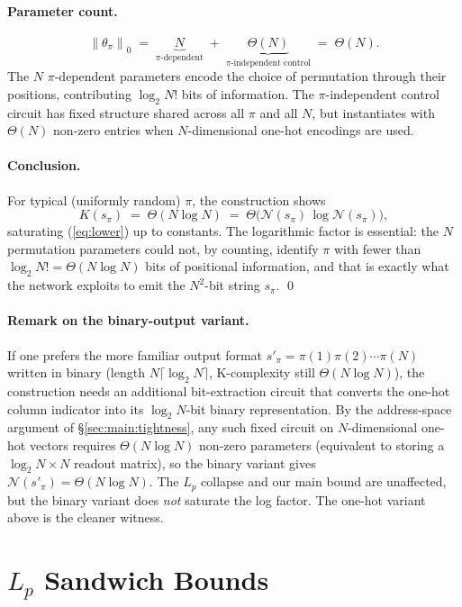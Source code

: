 \documentclass{article}
\theoremstyle{definition}
\newcommand{\norm}[1]{\left\lVert#1\right\rVert}
\newcommand{\nc}{\mathcal{N}}
\begin{document}
\paragraph{Parameter count.}
\[
  \norm{\theta_\pi}_0 \;=\; \underbrace{N}_{\pi\text{-dependent}} \;+\; \underbrace{\Theta(N)}_{\pi\text{-independent control}} \;=\; \Theta(N).
\]
The $N$ $\pi$-dependent parameters encode the choice of permutation through
their positions, contributing $\log_2 N!$ bits of information. The
$\pi$-independent control circuit has fixed structure shared across all $\pi$
and all $N$, but instantiates with $\Theta(N)$ non-zero entries when
$N$-dimensional one-hot encodings are used.

\paragraph{Conclusion.} For typical (uniformly random) $\pi$, the construction shows
\[
  K(s_\pi) \;=\; \Theta(N \log N) \;=\; \Theta\!\bigl(\nc(s_\pi)\, \log \nc(s_\pi)\bigr),
\]
saturating (\ref{eq:lower}) up to constants. The logarithmic factor is
essential: the $N$ permutation parameters could not, by counting, identify
$\pi$ with fewer than $\log_2 N! = \Theta(N \log N)$ bits of positional
information, and that is exactly what the network exploits to emit the
$N^2$-bit string $s_\pi$. \qed

\paragraph{Remark on the binary-output variant.} If one prefers the more familiar output format $s'_\pi =
  \pi(1)\pi(2)\cdots\pi(N)$ written in binary (length $N \lceil \log_2 N \rceil$,
K-complexity still $\Theta(N \log N)$), the construction needs an additional
bit-extraction circuit that converts the one-hot column indicator into its
$\log_2 N$-bit binary representation. By the address-space argument of
\S\ref{sec:main:tightness}, any such fixed circuit on $N$-dimensional one-hot
vectors requires $\Theta(N \log N)$ non-zero parameters (equivalent to storing
a $\log_2 N \times N$ readout matrix), so the binary variant gives $\nc(s'_\pi)
  = \Theta(N \log N)$. The $L_p$ collapse and our main bound are unaffected, but
the binary variant does \emph{not} saturate the log factor. The one-hot variant
above is the cleaner witness.

\section{$L_p$ Sandwich Bounds}\label{app:lp}
\end{document}
